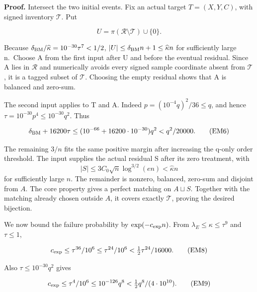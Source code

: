 \documentclass[11pt,a4paper]{article}
\newcommand{\labelledparagraphstart}{\par\addvspace{3pt plus 1pt minus 1pt}\noindent}
\begin{document}
\labelledparagraphstart\textbf{Proof.} Intersect the two initial events. Fix an actual target \(T=(X,Y,C)\), with signed inventory \(\mathcal T\). Put

\begin{equation}
U=\pi(\mathcal R\setminus\mathcal T)\cup\{0\}.
\tag{EM5}\label{eq:EM5}
\end{equation}

Because \(\delta_{\rm BM}/\widehat{\kappa}=10^{-30}\tau ^{7}<1/2\), \(|U|\le \delta_{\rm BM} n+1\le \widehat{\kappa} n\) for sufficiently large n.~Choose A from the first input after U and before the eventual residual. Since A lies in \(\mathcal R\) and numerically avoids every signed sample coordinate absent from \(\mathcal T\), it is a tagged subset of \(\mathcal T\). Choosing the empty residual shows that A is balanced and zero-sum.

The second input applies to T and A. Indeed \(p=(10^{-4}q)^2/36\le q\), and hence \(\tau =10^{-30}p^{4}\le 10^{-30}q^{2}\). Thus

\begin{equation}
\delta_{\rm BM}+16200\tau
 \le (10^{-66}+16200\cdot10^{-30})q^2
 <q^2/20000.
\tag{EM6}\label{eq:EM6}
\end{equation}

The remaining \(3/n\) fits the same positive margin after increasing the q-only order threshold. The input supplies the actual residual S after its zero treatment, with \begin{equation}
|S|\le3C_0\sqrt n\log^{3/2}(en)<\widehat\kappa n
\tag{EM7}\label{eq:EM7}
\end{equation} for sufficiently large \(n\). The remainder is nonzero, balanced, zero-sum and disjoint from \(A\). The core property gives a perfect matching on \(A\sqcup S\). Together with the matching already chosen outside \(A\), it covers exactly \(\mathcal T\), proving the desired bijection.

We now bound the failure probability by \(\exp(-c_{\rm exp}n)\). From \(\lambda_E\le \kappa\le \tau ^{9}\) and \(\tau \le 1\),

\begin{equation}
c_{\rm exp}\le\tau^{36}/10^6
 \le\tau^{24}/10^6
 <\tfrac12\tau^{24}/16000.
\tag{EM8}\label{eq:EM8}
\end{equation}

Also \(\tau \le 10^{-30}q^{2}\) gives

\begin{equation}
c_{\rm exp}\le\tau^4/10^6
 \le10^{-126}q^8
 <\tfrac12 q^8/(4\cdot10^{10}).
\tag{EM9}\label{eq:EM9}
\end{equation}
\end{document}
